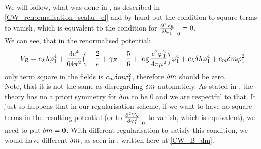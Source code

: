 We will follow, what was done in \cite{Coleman1973}, as described in 
\ref{CW_renormalisation_scalar_el} and by hand put the condition to square terms to vanish, 
which is equvalent to the condition for $\frac{\partial^2 V_R}{\partial \varphi_1^2}\Big|_{0} = 0$. \\

We can see, that in the renormalised potential:
\begin{align}
V_R = c_\lambda\lambda\varphi_1^4 + \frac{3e^4}{64\pi^2}\Big(-\frac{2}{\epsilon}+\gamma_E- 
\frac{5}{6}+
\log{\frac{e^2\varphi_1^2}{4\pi\mu^2}}\Big)\varphi_1^4 + c_\lambda\delta\lambda\varphi_1^4+c_m\delta m\varphi_1^2
\end{align}
only term square in the fields is $c_m\delta m\varphi_1^2$, therefore $\delta m$ should be zero. \\
Note, that it is not the same as disregarding $\delta m$ automaticly. As stated in \cite{Coleman1973}, 
the theory has no a priori symmetry for $\delta m$ to be $0$ and we are respectful to that. 
It just so happens that in our regularisation scheme, if we want to have no square terms in the 
resulting potential (or to $\frac{\partial^2 V_R}{\partial \varphi_1^2}\Big|_{0}$ to vanish, which is equivalent), we need to put 
$\delta m = 0$. With different regularisation to satisfy this condition, we would have different $\delta m$, 
as seen in \cite{Coleman1973}, written here at \ref{CW_B_dm}. \\

